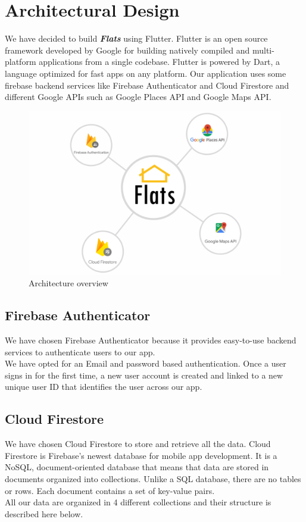 \chapter{Architectural Design}
We have decided to build \textbf{\textit{Flats}} using Flutter. Flutter is an open source framework developed by Google for building natively compiled and multi-platform applications from a single codebase. Flutter is powered by Dart, a language optimized for fast apps on any platform.
Our application uses some firebase backend services like Firebase Authenticator and Cloud Firestore and different Google APIs such as Google Places API and Google Maps API.

\begin{figure}[h]
            \centering
            \includegraphics[scale=0.5]{images/arch.png}
            \caption{Architecture overview}
\end{figure}
        
\section{Firebase Authenticator}
We have chosen Firebase Authenticator because it provides easy-to-use backend services to authenticate users to our app.\\
We have opted for an Email and password based authentication. Once a user signs in for the first time, a new user account is created and linked to a new unique user ID that identifies the user across our app.

\section{Cloud Firestore}
We have chosen Cloud Firestore to store and retrieve all the data. Cloud Firestore is Firebase's newest database for mobile app development. It is a NoSQL, document-oriented database that means that data are stored in documents organized into collections. Unlike a SQL database, there are no tables or rows.
Each document contains a set of key-value pairs.\\
All our data are organized in 4 different collections and their structure is described here below.\\

